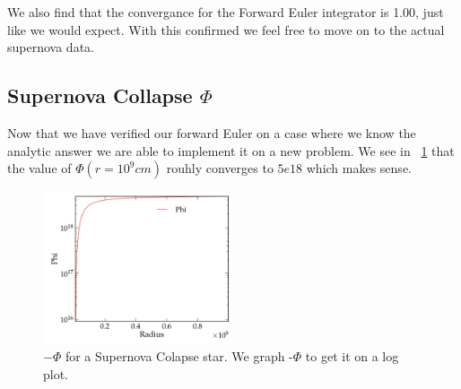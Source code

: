 \documentclass[11pt,letterpaper]{article}
\begin{document}
We also find that the convergance for the Forward Euler integrator is 1.00, just
like we would expect. With this confirmed we feel free to move on to the actual
supernova data. 

\subsection{Supernova Collapse $\Phi$}

Now that we have verified our forward Euler on a case where we know the analytic
answer we are able to implement it on a new problem. We see in ~\ref{fig:phi}
that the value of $\Phi(r= 10^9cm)$ rouhly converges to $5e18$ which makes sense.

\begin{figure}[bth]
\centering
\includegraphics[width=0.5\textwidth]{3.pdf}
\caption{$-\Phi$ for a Supernova Colapse star. We graph -$\Phi$ to get it on a 
log plot.}
\label{fig:phi}
\end{figure}
\end{document}

